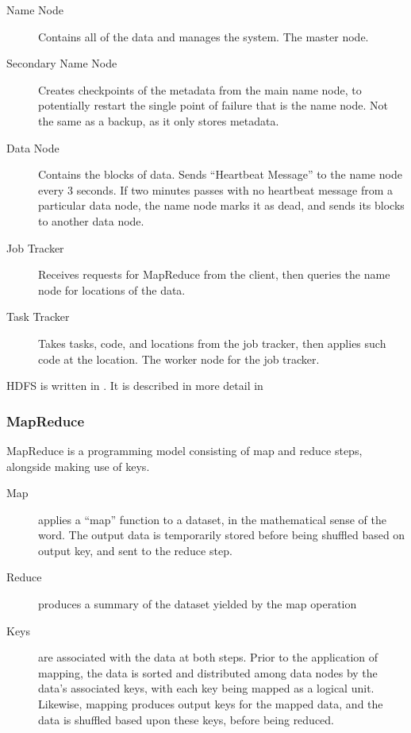 \begin{description}

	\item[Name Node]
		Contains all of the data and manages the system.
		The master node.
	\item[Secondary Name Node]
		Creates checkpoints of the metadata from the main name node, to
		potentially restart the single point of failure that is the name node.
		Not the same as a backup, as it only stores metadata.
	\item[Data Node]
		Contains the blocks of data.
		Sends ``Heartbeat Message'' to the name node every 3 seconds.
		If two minutes passes with no heartbeat message from a particular data node, the name node marks it as dead, and sends its blocks to another data node.
	\item[Job Tracker]
		Receives requests for MapReduce from the client, then queries the name
		node for locations of the data.
	\item[Task Tracker]
		Takes tasks, code, and locations from the job tracker, then applies such
		code at the location.
		The worker node for the job tracker.
\end{description}

HDFS is written in .
It is described in more detail in \cite{shvachko2010hadoop}

\subsubsection{MapReduce}\label{sec:mapreduce}

MapReduce is a programming model consisting of map and reduce steps, alongside making use of keys.

\begin{description}

	\item[Map]
		applies a ``map'' function to a dataset, in the mathematical sense of
		the word.
		The output data is temporarily stored before being shuffled based on output key, and sent to the reduce step.
	\item[Reduce]
		produces a summary of the dataset yielded by the map operation
	\item[Keys]
		are associated with the data at both steps.
		Prior to the application of mapping, the data is sorted and distributed among data nodes by the data's associated keys, with each key being mapped as a logical unit.
		Likewise, mapping produces output keys for the mapped data, and the data is shuffled based upon these keys, before being reduced.
\end{description}

